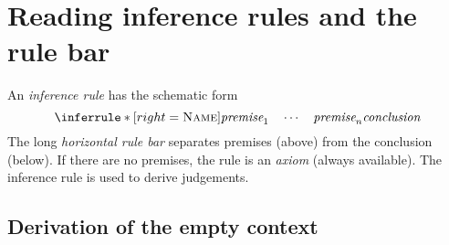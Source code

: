 \documentclass{article}
\newcommand{\Type}{\ensuremath{\mathsf{Type}}}
\newcommand{\judg}[3]{#1 \vdash #2 : #3}   %
\newcommand{\rulename}[1]{\textsc{#1}}
\begin{document}
\section{Reading inference rules and the rule bar}

An \emph{inference rule} has the schematic form
\[
\inferrule*[right=\rulename{Name}]{
\textit{premise}_1 \quad \cdots \quad \textit{premise}_n
}{
\textit{conclusion}
}
\]
The long \emph{horizontal rule bar} separates premises (above) from the conclusion (below).  
If there are no premises, the rule is an \emph{axiom} (always available). The inference rule is used to derive judgements. 





\subsection*{Derivation of the empty context}
\end{document}
